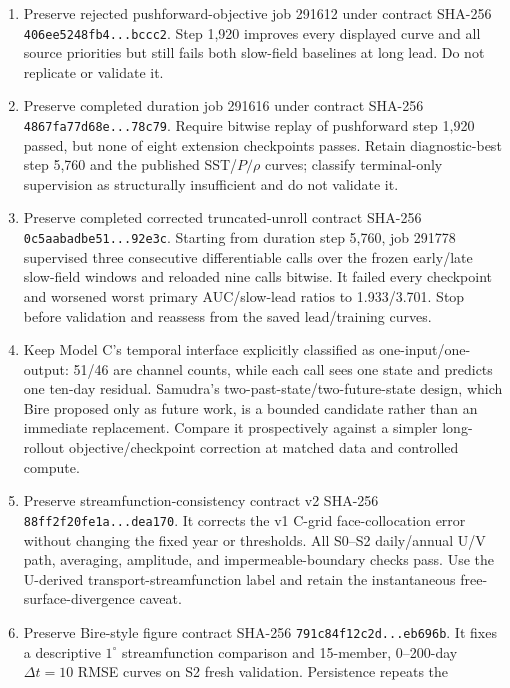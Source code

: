 \documentclass[11pt]{article}
\begin{document}
\begin{enumerate}
  checkpoint-only correction.
\item Preserve rejected pushforward-objective job 291612 under contract SHA-256
  \texttt{406ee5248fb4\allowbreak...\allowbreak bccc2}.  Step 1,920 improves every
  displayed curve and all source priorities but still fails both slow-field baselines
  at long lead.  Do not replicate or validate it.
\item Preserve completed duration job 291616 under contract SHA-256
  \texttt{4867fa77d68e\allowbreak...\allowbreak78c79}.  Require bitwise replay of
  pushforward step 1,920 passed, but none of eight extension checkpoints passes.
  Retain diagnostic-best step 5,760 and the published SST/\(P/\rho\) curves; classify
  terminal-only supervision as structurally insufficient and do not validate it.
\item Preserve completed corrected truncated-unroll contract SHA-256
  \texttt{0c5aabadbe51\allowbreak...\allowbreak92e3c}.  Starting from duration step
  5,760, job 291778 supervised three consecutive differentiable calls over the frozen
  early/late slow-field windows and reloaded nine calls bitwise.  It failed every
  checkpoint and worsened worst primary AUC/slow-lead ratios to 1.933/3.701.
  Stop before validation and reassess from the saved lead/training curves.
\item Keep Model C's temporal interface explicitly classified as one-input/one-output:
  51/46 are channel counts, while each call sees one state and predicts one ten-day
  residual.  Samudra's two-past-state/two-future-state design, which Bire proposed only
  as future work, is a bounded candidate rather than an immediate replacement.
  Compare it prospectively against a simpler long-rollout objective/checkpoint
  correction at matched data and controlled compute.
\item Preserve streamfunction-consistency contract v2 SHA-256
  \texttt{88ff2f20fe1a\allowbreak...\allowbreak dea170}.  It corrects the v1 C-grid
  face-collocation error without changing the fixed year or thresholds.  All S0--S2
  daily/annual U/V path, averaging, amplitude, and impermeable-boundary checks pass.
  Use the U-derived transport-streamfunction label and retain the instantaneous
  free-surface-divergence caveat.
\item Preserve Bire-style figure contract SHA-256
  \texttt{791c84f12c2d\allowbreak...\allowbreak eb696b}.  It fixes a descriptive
  \(1^\circ\) streamfunction comparison and 15-member, 0--200-day
  \(\Delta t=10\) RMSE curves on S2 fresh validation.  Persistence repeats the

\end{enumerate}
\end{document}
